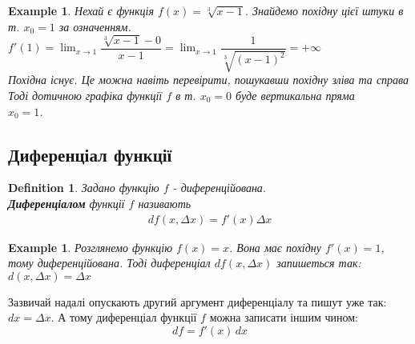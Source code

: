 \documentclass[a4paper, 14pt]{article}
\def\huge{\displaystyle}
\theoremstyle{theoremdd}
\theoremstyle{theoremdd}
\newtheorem{definition}[theorem]{Definition}
\theoremstyle{theoremdd}
\theoremstyle{theoremdd}
\newtheorem{example}[theorem]{Example}
\theoremstyle{theoremdd}
\theoremstyle{theoremdd}
\theoremstyle{theoremdd}
\theoremstyle{theoremdd}
\begin{document}
\begin{example}
Нехай є функція $f(x) = \sqrt[3]{x-1}$. Знайдемо похідну цієї штуки в т. $x_0 = 1$ за означенням.\\
$f'(1) = \huge \lim_{x \to 1} \dfrac{\sqrt[3]{x-1}-0}{x-1} = \lim_{x \to 1} \dfrac{1}{\sqrt[3]{(x-1)^2}} = + \infty$\\
Похідна існує. Це можна навіть перевірити, пошукавши похідну зліва та справа\\
Тоді дотичною графіка функції $f$ в т. $x_0 = 0$ буде вертикальна пряма\\
$x_0 = 1$.\\
\begin{figure}[H]
\centering
{
}
\end{figure}
\end{example}

\subsection{Диференціал функції}
\begin{definition}
Задано функцію $f$ - диференційована.\\
\textbf{Диференціалом} функції $f$ називають
\begin{align*}
df(x,\Delta x) = f'(x) \Delta x
\end{align*}
\end{definition}

\begin{example}
Розглянемо функцію $f(x) = x$. Вона має похідну $f'(x) = 1$, тому диференційована. Тоді диференціал $df(x,\Delta x)$ запишеться так:\\
$d(x,\Delta x) = \Delta x$
\end{example}
Зазвичай надалі опускають другий аргумент диференціалу та пишут уже так: $dx = \Delta x$. А тому диференціал функції $f$ можна записати іншим чином:
$$ df = f'(x)\,dx $$
\end{document}
